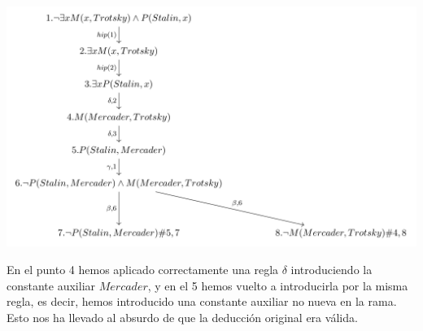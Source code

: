 \begin{example}
\begin{center}
\includegraphics[scale = 0.36]{figures/tableau3.png}
\end{center}

En el punto 4 hemos aplicado correctamente una regla $\delta$ introduciendo la constante auxiliar $Mercader$, y en el 5 hemos vuelto a introducirla por la misma regla, es decir, hemos introducido una constante auxiliar no nueva en la rama. Esto nos ha llevado al absurdo de que la deducción original era válida.  
\end{example}

